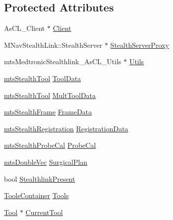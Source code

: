 \subsection*{Protected Attributes}
\begin{DoxyCompactItemize}
\item 
As\+C\+L\+\_\+\+Client $\ast$ \hyperlink{classmts_medtronic_stealthlink_a1330ec37490335ecddccec758efd763c}{Client}
\item 
M\+Nav\+Stealth\+Link\+::\+Stealth\+Server $\ast$ \hyperlink{classmts_medtronic_stealthlink_a8b38a61b23060e7f601e1736d7072804}{Stealth\+Server\+Proxy}
\item 
mts\+Medtronic\+Stealthlink\+\_\+\+As\+C\+L\+\_\+\+Utils $\ast$ \hyperlink{classmts_medtronic_stealthlink_ab6970edff3db4896a9cce824323f3c3e}{Utils}
\item 
\hyperlink{classmts_stealth_tool}{mts\+Stealth\+Tool} \hyperlink{classmts_medtronic_stealthlink_aacf8237d9bfdc92bda9296875469b23a}{Tool\+Data}
\item 
\hyperlink{classmts_stealth_tool}{mts\+Stealth\+Tool} \hyperlink{classmts_medtronic_stealthlink_ae9ec69cddab3fbe60851cdb37b77f1ad}{Mult\+Tool\+Data}
\item 
\hyperlink{classmts_stealth_frame}{mts\+Stealth\+Frame} \hyperlink{classmts_medtronic_stealthlink_a063e3d22d099f48291852d9f0557fcdf}{Frame\+Data}
\item 
\hyperlink{classmts_stealth_registration}{mts\+Stealth\+Registration} \hyperlink{classmts_medtronic_stealthlink_a199da265ece19f82bd552db08f0e1f6e}{Registration\+Data}
\item 
\hyperlink{classmts_stealth_probe_cal}{mts\+Stealth\+Probe\+Cal} \hyperlink{classmts_medtronic_stealthlink_a0a1b2f32b469292811f9d1b8822c9c7b}{Probe\+Cal}
\item 
\hyperlink{mts_vector_8h_af69167a5dc2ad33eb93965b9387d8403}{mts\+Double\+Vec} \hyperlink{classmts_medtronic_stealthlink_ae24546a408ca0acb2dc6ccd4c42578b0}{Surgical\+Plan}
\item 
bool \hyperlink{classmts_medtronic_stealthlink_a42444da9be77b2b040660fea34bc9690}{Stealthlink\+Present}
\item 
\hyperlink{classmts_medtronic_stealthlink_ab6218cf1cbe807b4cc2cc262528e7ae9}{Tools\+Container} \hyperlink{classmts_medtronic_stealthlink_acb4d5215e055c4c39c62d3a06259ccb4}{Tools}
\item 
\hyperlink{classmts_medtronic_stealthlink_1_1_tool}{Tool} $\ast$ \hyperlink{classmts_medtronic_stealthlink_a4411bd7e0677a6acecedd426640ecbc8}{Current\+Tool}

\end{DoxyCompactItemize}
